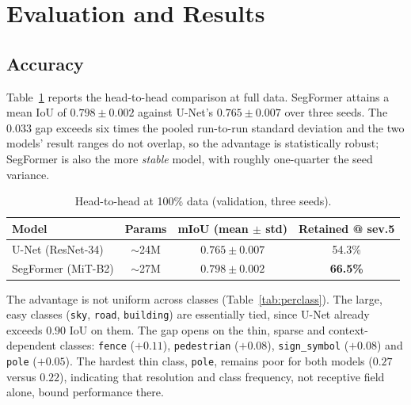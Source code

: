 \documentclass[11pt,a4paper]{article}
\begin{document}
\section{Evaluation and Results}

\subsection{Accuracy}

Table~\ref{tab:headline} reports the head-to-head comparison at full data.
SegFormer attains a mean IoU of $0.798\pm0.002$ against U-Net's
$0.765\pm0.007$ over three seeds. The $0.033$ gap exceeds six times the pooled
run-to-run standard deviation and the two models' result ranges do not overlap,
so the advantage is statistically robust; SegFormer is also the more
\emph{stable} model, with roughly one-quarter the seed variance.

\begin{table}[H]
\centering
\begin{tabular}{lccc}
\toprule
Model & Params & mIoU (mean $\pm$ std) & Retained @ sev.5 \\
\midrule
U-Net (ResNet-34)  & $\sim$24M & $0.765 \pm 0.007$ & 54.3\% \\
SegFormer (MiT-B2) & $\sim$27M & $\mathbf{0.798 \pm 0.002}$ & \textbf{66.5\%} \\
\bottomrule
\end{tabular}
\caption{Head-to-head at 100\% data (validation, three seeds).}
\label{tab:headline}
\end{table}

The advantage is not uniform across classes (Table~\ref{tab:perclass}). The
large, easy classes (\texttt{sky}, \texttt{road}, \texttt{building}) are
essentially tied, since U-Net already exceeds $0.90$ IoU on them. The gap opens
on the thin, sparse and context-dependent classes: \texttt{fence} ($+0.11$),
\texttt{pedestrian} ($+0.08$), \texttt{sign\_symbol} ($+0.08$) and
\texttt{pole} ($+0.05$). The hardest thin class, \texttt{pole}, remains poor
for both models ($0.27$ versus $0.22$), indicating that resolution and class
frequency, not receptive field alone, bound performance there.
\end{document}
